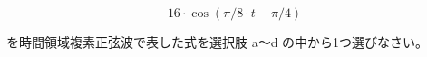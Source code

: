 \[
16 \cdot \cos ( \pi/8 \cdot t - \pi/4 )
\]

\bigskip
\noindent を時間領域複素正弦波で表した式を選択肢 a〜d の中から1つ選びなさい。
